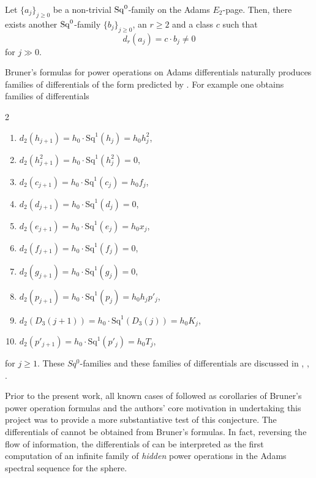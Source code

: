 \begin{cnj}\label{conj: stable length}
  Let $\{a_j\}_{j \geq 0}$ be a non-trivial $\operatorname{\mathrm{Sq}}^0$-family on the Adams $E_2$-page.
  Then, there exists another $\operatorname{\mathrm{Sq}}^0$-family $\{b_j\}_{j \geq 0}$, an $r \geq 2$ and a class $c$ such that
  \[ d_r(a_j) = c \cdot b_j \neq 0 \]
  for $j \gg 0$.
\end{cnj}

\begin{exm} \label{exm:Bruner formula}
  Bruner's formulas for power operations on Adams differentials naturally produces families of differentials of the form predicted by . For example one obtains families of differentials 
  \setlength{\columnsep}{-30pt}
  \begin{multicols}{2}
    \begin{enumerate}[leftmargin=30pt, rightmargin=0pt]
    \item $d_2(h_{j+1}) = h_0 \cdot \mathrm{Sq}^1(h_j) = h_0h_j^2$,
    \item $d_2(h_{j+1}^2) = h_0 \cdot \mathrm{Sq}^1(h_j^2) = 0$,
    \item $d_2(c_{j+1}) = h_0 \cdot \mathrm{Sq}^1(c_j) = h_0f_j$,
    \item $d_2(d_{j+1}) = h_0 \cdot \mathrm{Sq}^1(d_j) = 0$,
    \item $d_2(e_{j+1}) = h_0 \cdot \mathrm{Sq}^1(e_j) = h_0x_j$,
    \item $d_2(f_{j+1}) = h_0 \cdot \mathrm{Sq}^1(f_j) = 0$,
    \item $d_2(g_{j+1}) = h_0 \cdot \mathrm{Sq}^1(g_j) = 0$,
    \item $d_2(p_{j+1}) = h_0 \cdot \mathrm{Sq}^1(p_j) = h_0h_jp'_j$,
    \item $d_2(D_3(j+1)) = h_0 \cdot \mathrm{Sq}^1(D_3(j)) = h_0K_j$,
    \item $d_2(p'_{j+1}) = h_0 \cdot \mathrm{Sq}^1(p'_{j}) = h_0T_j$,
    \end{enumerate}    
  \end{multicols}
  \noindent for $j \geq 1$.
  \setlength{\columnsep}{0pt}
  These $Sq^0$-families and these families of differentials are discussed in \cite{BMMS}, \cite{LinExt}, \cite{Ext5}.
\end{exm}

Prior to the present work, all known cases of  followed as corollaries of Bruner's power operation formulas
and the authors' core motivation in undertaking this project was to provide a more substantiative test of this conjecture.
The differentials of  cannot be obtained from Bruner's formulas. 
In fact, reversing the flow of information, the differentials of  can be interpreted as the first computation of an infinite family of \emph{hidden} power operations in the Adams spectral sequence for the sphere.

